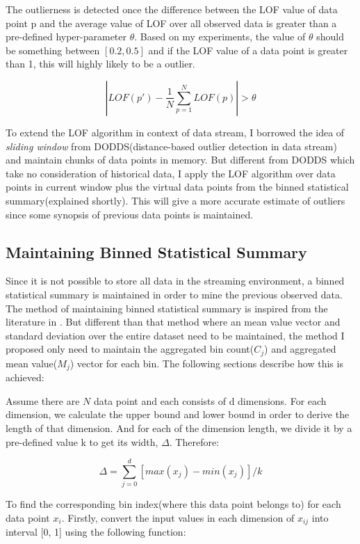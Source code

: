 \documentclass[11pt]{article}       %
\begin{document}
The outlierness is detected once the difference between the LOF value of data point p and the average value of LOF over all observed data is greater than a pre-defined hyper-parameter $\theta$. Based on my experiments, the value of $\theta$ should be something between $[0.2, 0.5]$ and if the LOF value of a data point is greater than 1, this will highly likely to be a outlier.

\[ | LOF(p') - \frac{1}{N} \sum_{p=1}^{N} LOF(p) | > \theta \]

To extend the LOF algorithm in context of data stream, I borrowed the idea of \textit{sliding window} from DODDS(distance-based outlier detection in data stream) and maintain chunks of data points in memory. But different from DODDS which take no consideration of historical data, I apply the LOF algorithm over data points in current window plus the virtual data points from the binned statistical summary(explained shortly). This will give a more accurate estimate of outliers since some synopsis of previous data points is maintained.

\subsection{Maintaining Binned Statistical Summary} \label{subsect2}

Since it is not possible to store all data in the streaming environment, a binned statistical summary is maintained in order to mine the previous observed data. The method of maintaining binned statistical summary is inspired from the literature in \cite{7516110}. But different than that method where an mean value vector and standard deviation over the entire dataset need to be maintained, the method I proposed only need to maintain the aggregated bin count($C_j$) and aggregated mean value($M_j$) vector for each bin. The following sections describe how this is achieved:

Assume there are $N$ data point and each consists of d dimensions. For each dimension, we calculate the upper bound and lower bound in order to derive the length of that dimension. And for each of the dimension length, we divide it by a pre-defined value k to get its width, $\Delta$.  Therefore:

\[ \Delta = \sum_{j=0}^{d} [max(x_j) - min(x_j)] / k \]

To find the corresponding bin index(where this data point belongs to) for each data point $x_i$. Firstly, convert the input values in each dimension of $x_{ij}$ into interval [0, 1] using the following function:
\end{document}
